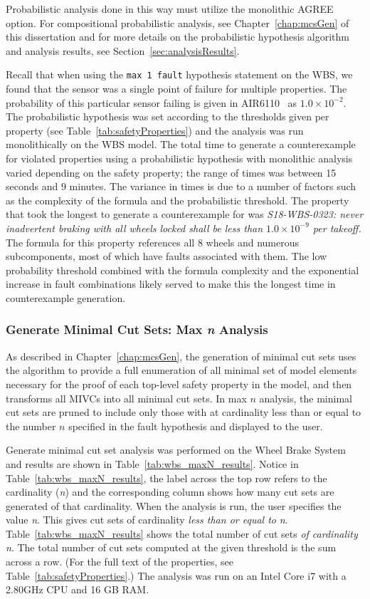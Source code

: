 Probabilistic analysis done in this way must utilize the monolithic AGREE option. For compositional probabilistic analysis, see Chapter~\ref{chap:mcsGen} of this dissertation and for more details on the probabilistic hypothesis algorithm and analysis results, see Section~\ref{sec:analysisResults}. 

Recall that when using the \texttt{max 1 fault} hypothesis statement on the WBS, we found that the sensor was a single point of failure for multiple properties. The probability of this particular sensor failing is given in AIR6110~\cite{AIR6110} as $1.0 \times 10^{-2}$. The probabilistic hypothesis was set according to the thresholds given per property (see Table~\ref{tab:safetyProperties}) and the analysis was run monolithically on the WBS model. The total time to generate a counterexample for violated properties using a probabilistic hypothesis with monolithic analysis varied depending on the safety property; the range of times was between 15 seconds and 9 minutes. The variance in times is due to a number of factors such as the complexity of the formula and the probabilistic threshold. The property that took the longest to generate a counterexample for was {\em S18-WBS-0323: never inadvertent braking with all wheels locked shall be less than $1.0 \times 10^{-9}$ per takeoff.} The formula for this property references all 8 wheels and numerous subcomponents, most of which have faults associated with them. The low probability threshold combined with the formula complexity and the exponential increase in fault combinations likely served to make this the longest time in counterexample generation. 

\subsubsection{Generate Minimal Cut Sets: Max \textit{n} Analysis}
\label{sec:maxN_generate}
As described in Chapter~\ref{chap:mcsGen}, the generation of minimal cut sets uses the \aivcalg algorithm to provide a full enumeration of all minimal set of model elements necessary for the proof of each top-level safety property in the model, and then transforms all MIVCs into all minimal cut sets. In max $n$ analysis, the minimal cut sets are pruned to include only those with at cardinality less than or equal to the number $n$ specified in the fault hypothesis and displayed to the user.

Generate minimal cut set analysis was performed on the Wheel Brake System and results are shown in Table~\ref{tab:wbs_maxN_results}. Notice in Table~\ref{tab:wbs_maxN_results}, the label across the top row refers to the cardinality (\textit{n}) and the corresponding column shows how many cut sets are generated of that cardinality. When the analysis is run, the user specifies the value \textit{n}. This gives cut sets of cardinality \textit{less than or equal to} \textit{n}. Table~\ref{tab:wbs_maxN_results} shows the total number of cut sets {\em of cardinality n}. The total number of cut sets computed at the given threshold is the sum across a row. (For the full text of the properties, see Table~\ref{tab:safetyProperties}.) The analysis was run on an Intel Core i7 with a 2.80GHz CPU and 16 GB RAM.


